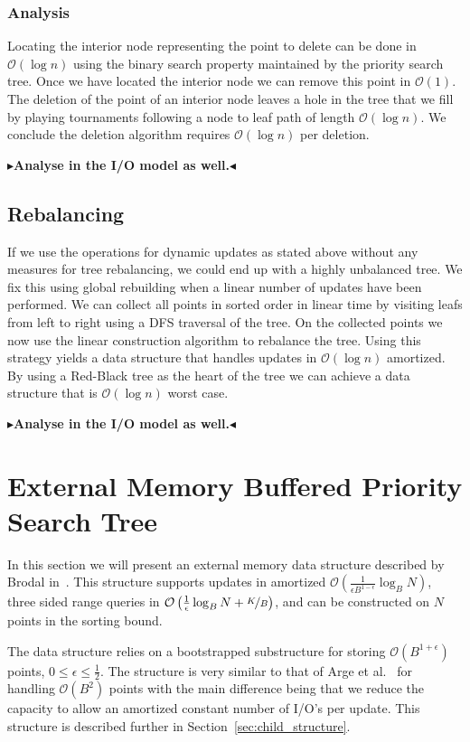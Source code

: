 \documentclass[twoside,11pt,openright]{report}
\newcommand{\todo}[1]{{\color[rgb]{.5,0,0}\textbf{$\blacktriangleright$#1$\blacktriangleleft$}}}
\begin{document}
\subsection*{Analysis}
Locating the interior node representing the point to delete can be done in $\mathcal{O}(\log n)$ using the binary search property maintained by the priority search tree. Once we have located the interior node we can remove this point in $\mathcal{O}(1)$. The deletion of the point of an interior node leaves a hole in the tree that we fill by playing tournaments following a node to leaf path of length $\mathcal{O}(\log n)$. We conclude the deletion algorithm requires $\mathcal{O}(\log n)$ per deletion.

\todo{Analyse in the I/O model as well.}

\section{Rebalancing}
If we use the operations for dynamic updates as stated above without any measures for tree rebalancing, we could end up with a highly unbalanced tree. We fix this using global rebuilding when a linear number of updates have been performed. We can collect all points in sorted order in linear time by visiting leafs from left to right using a DFS traversal of the tree. On the collected points we now use the linear construction algorithm to rebalance the tree. Using this strategy yields a data structure that handles updates in $\mathcal{O}(\log n)$ amortized. By using a Red-Black tree as the heart of the tree we can achieve a data structure that is $\mathcal{O}(\log n)$ worst case.

\todo{Analyse in the I/O model as well.}

\chapter{External Memory Buffered Priority Search Tree}
\label{chp:epst}
In this section we will present an external memory data structure described by Brodal in~\cite{DBLP:journals/corr/Brodal15}. This structure supports updates in amortized $\mathcal{O}\left(\frac{1}{\epsilon B^{1-\epsilon}} \log_B N\right)$, three sided range queries in $\mathcal{O}\left(\frac{1}{\epsilon}\log_B N + \nicefrac{K}{B}\right)$, and can be constructed on $N$ points in the sorting bound.

The data structure relies on a bootstrapped substructure for storing $\mathcal{O}(B^{1+\epsilon})$ points, $0 \leq \epsilon \leq \frac{1}{2}$.
The structure is very similar to that of Arge et al.~\cite[Section~3.1]{arge_vitter_2003} for handling $\mathcal{O}(B^2)$ points with the main difference being that we reduce the capacity to allow an amortized constant number of I/O's per update. This structure is described further in Section~\ref{sec:child_structure}.
\end{document}
